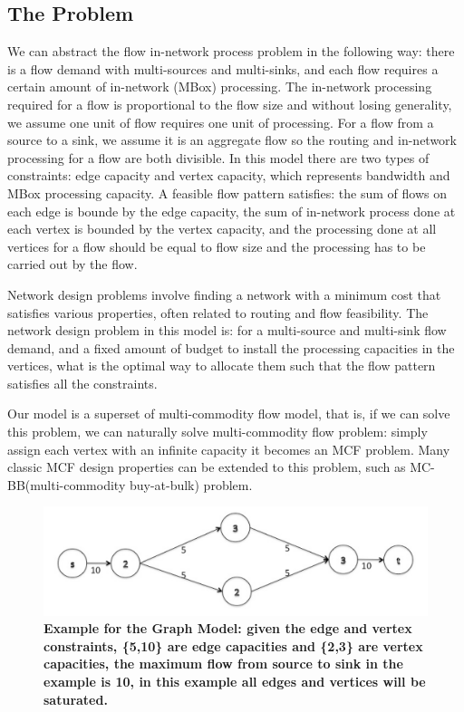 \documentclass[11pt]{article}
\begin{document}
\subsection{The Problem}
We can abstract the flow in-network process problem in the following way: there is a flow demand with multi-sources and multi-sinks, and each flow requires a certain amount of in-network (MBox) processing. The in-network processing required for a flow is proportional to the flow size and without losing generality, we assume one unit of flow requires one unit of processing. For a flow from a source to a sink, we assume it is an aggregate flow so the routing and in-network processing for a flow are both divisible. In this model there are two types of constraints: edge capacity and vertex capacity, which represents bandwidth and MBox processing capacity. A feasible flow pattern satisfies: the sum of flows on each edge is bounde by the edge capacity, the sum of in-network process done at each vertex is bounded by the vertex capacity, and the processing done at all vertices for a flow should be equal to flow size and the processing has to be carried out by the flow.

Network design problems involve finding a network with a minimum cost that satisfies various properties, often related to routing and flow feasibility. The network design problem in this model is: for a multi-source and multi-sink flow demand, and a fixed amount of budget to install the processing capacities in the vertices, what is the optimal way to allocate them such that the flow pattern satisfies all the constraints.

Our model is a superset of multi-commodity flow model\cite{MCF}, that is, if we can solve this problem, we can naturally solve multi-commodity flow problem: simply assign each vertex with an infinite capacity it becomes an MCF problem. Many classic MCF design properties can be extended to this problem, such as MC-BB(multi-commodity buy-at-bulk) problem\cite{BuyAtBulk,Charikar05,Chekuri2007}. 

\begin{figure}[h]
\includegraphics[width=\linewidth]{picture1.png} 
\caption{ \textbf{Example for the Graph Model: given the edge and vertex constraints, \textnormal{\{5,10\} }are edge capacities and \{2,3\} are vertex capacities, the maximum flow from source to sink in the example is 10, in this example all edges and vertices will be saturated.} }
 \end{figure}
\end{document}
